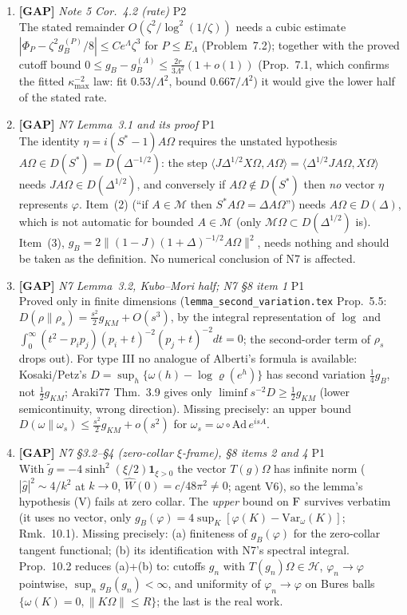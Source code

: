 \documentclass[11pt]{article}
\begin{document}
\begin{enumerate}[leftmargin=1.6em,itemsep=6pt]
\item \textbf{[GAP]} \emph{Note 5 Cor.~4.2 (rate)} \hfill\textsc{P2}\\ The stated remainder \(O(\zeta^2/\log^2(1/\zeta))\) needs a cubic estimate \(|\Phi_P-\zeta^2g_B^{(P)}/8|\le Ce^{\Lambda}\zeta^3\) for \(P\le E_\Lambda\) (Problem~7.2); together with the proved cutoff bound \(0\le g_B-g_B^{(\Lambda)}\le\frac{2r}{3\Lambda^2}(1+o(1))\) (Prop.~7.1, which confirms the fitted \(\kappa_{\max}^{-2}\) law: fit \(0.53/\Lambda^2\), bound \(0.667/\Lambda^2\)) it would give the lower half of the stated rate.
\item \textbf{[GAP]} \emph{N7 Lemma~3.1 and its proof} \hfill\textsc{P1}\\ The identity \(\eta=i(S^*-1)A\Omega\) requires the unstated hypothesis \(A\Omega\in D(S^*)=D(\Delta^{-1/2})\): the step \(\langle J\Delta^{1/2}X\Omega,A\Omega\rangle=\langle\Delta^{1/2}JA\Omega,X\Omega\rangle\) needs \(JA\Omega\in D(\Delta^{1/2})\), and conversely if \(A\Omega\notin D(S^*)\) then \emph{no} vector \(\eta\) represents \(\varphi\). Item~(2) (``if \(A\in\mathcal M\) then \(S^*A\Omega=\Delta A\Omega\)'') needs \(A\Omega\in D(\Delta)\), which is not automatic for bounded \(A\in\mathcal M\) (only \(\mathcal M\Omega\subset D(\Delta^{1/2})\) is). Item~(3), \(g_B=2\|(1-J)(1+\Delta)^{-1/2}A\Omega\|^2\), needs nothing and should be taken as the definition. No numerical conclusion of N7 is affected.
\item \textbf{[GAP]} \emph{N7 Lemma~3.2, Kubo--Mori half; N7 \S8 item 1} \hfill\textsc{P1}\\ Proved only in finite dimensions (\texttt{lemma\_second\_variation.tex} Prop.~5.5: \(D(\rho\|\rho_s)=\frac{s^2}{2}g_{KM}+O(s^3)\), by the integral representation of \(\log\) and \(\int_0^\infty(t^2-p_ip_j)(p_i+t)^{-2}(p_j+t)^{-2}dt=0\); the second-order term of \(\rho_s\) drops out). For type III no analogue of Alberti's formula is available: Kosaki/Petz's \(D=\sup_h\{\omega(h)-\log\varrho(e^h)\}\) has second variation \(\frac14 g_B\), not \(\frac12 g_{KM}\); Araki77 Thm.~3.9 gives only \(\liminf s^{-2}D\ge\frac12 g_{KM}\) (lower semicontinuity, wrong direction). Missing precisely: an upper bound \(D(\omega\|\omega_s)\le\frac{s^2}{2}g_{KM}+o(s^2)\) for \(\omega_s=\omega\circ\mathrm{Ad}\,e^{isA}\).
\item \textbf{[GAP]} \emph{N7 \S3.2--\S4 (zero-collar \(\xi\)-frame), \S8 items 2 and 4} \hfill\textsc{P1}\\ With \(\tilde g=-4\sinh^2(\xi/2)\mathbf 1_{\xi>0}\) the vector \(T(g)\Omega\) has infinite norm (\(|\hat g|^2\sim4/k^2\) at \(k\to0\), \(\hat W(0)=c/48\pi^2\ne0\); agent V6), so the lemma's hypothesis (V) fails at zero collar. The \emph{upper} bound on \(\operatorname{F}\) survives verbatim (it uses no vector, only \(g_B(\varphi)=4\sup_K[\varphi(K)-\mathrm{Var}_\omega(K)]\); Rmk.~10.1). Missing precisely: (a) finiteness of \(g_B(\varphi)\) for the zero-collar tangent functional; (b) its identification with N7's spectral integral. Prop.~10.2 reduces (a)+(b) to: cutoffs \(g_n\) with \(T(g_n)\Omega\in\mathcal H\), \(\varphi_n\to\varphi\) pointwise, \(\sup_n g_B(g_n)<\infty\), and uniformity of \(\varphi_n\to\varphi\) on Bures balls \(\{\omega(K)=0,\|K\Omega\|\le R\}\); the last is the real work.

\end{enumerate}
\end{document}
